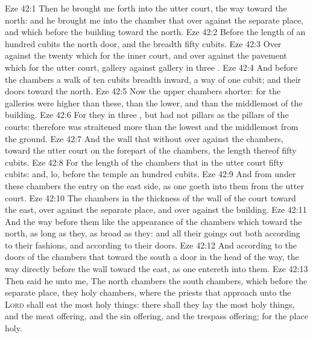 \vs Eze 42:1 Then he brought me forth into the utter court, the way toward the north: and he brought me into the chamber that  over against the separate place, and which  before the building toward the north.
\vs Eze 42:2 Before the length of an hundred cubits  the north door, and the breadth  fifty cubits.
\vs Eze 42:3 Over against the twenty  which  for the inner court, and over against the pavement which  for the utter court,  gallery against gallery in three .
\vs Eze 42:4 And before the chambers  a walk of ten cubits breadth inward, a way of one cubit; and their doors toward the north.
\vs Eze 42:5 Now the upper chambers  shorter: for the galleries were higher than these, than the lower, and than the middlemost of the building.
\vs Eze 42:6 For they  in three , but had not pillars as the pillars of the courts: therefore  was straitened more than the lowest and the middlemost from the ground.
\vs Eze 42:7 And the wall that  without over against the chambers, toward the utter court on the forepart of the chambers, the length thereof  fifty cubits.
\vs Eze 42:8 For the length of the chambers that  in the utter court  fifty cubits: and, lo, before the temple  an hundred cubits.
\vs Eze 42:9 And from under these chambers  the entry on the east side, as one goeth into them from the utter court.
\vs Eze 42:10 The chambers  in the thickness of the wall of the court toward the east, over against the separate place, and over against the building.
\vs Eze 42:11 And the way before them  like the appearance of the chambers which  toward the north, as long as they,  as broad as they: and all their goings out  both according to their fashions, and according to their doors.
\vs Eze 42:12 And according to the doors of the chambers that  toward the south  a door in the head of the way,  the way directly before the wall toward the east, as one entereth into them.
\vs Eze 42:13 Then said he unto me, The north chambers  the south chambers, which  before the separate place, they  holy chambers, where the priests that approach unto the \textsc{Lord} shall eat the most holy things: there shall they lay the most holy things, and the meat offering, and the sin offering, and the trespass offering; for the place  holy.
